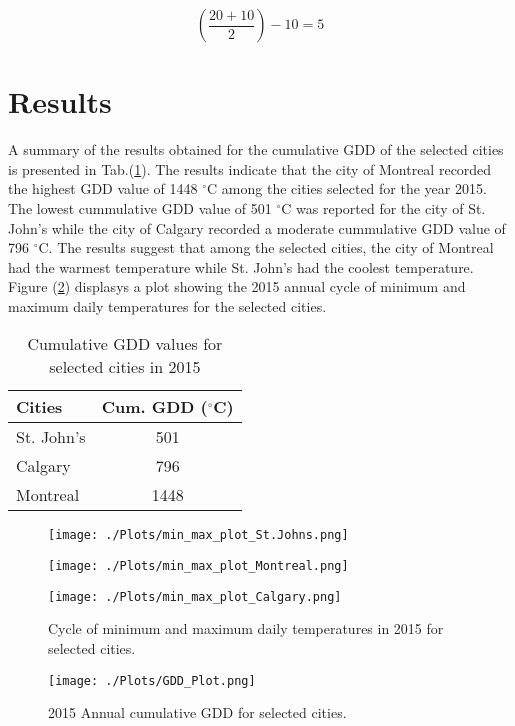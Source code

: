 \documentclass{article}
\begin{document}
\[ \left(\frac {20+10}{2}\right)-10=5 \] \par

\newpage
\section{ \bf Results}
A summary of the results obtained for the cumulative GDD of the selected cities is presented in Tab.(\ref{gdd-results}). The results indicate that the city of Montreal recorded the highest GDD value of 1448 $^{\circ}$C among the cities selected for the year 2015. The lowest cummulative GDD value of 501 $^{\circ}$C was reported for the city of St. John's while the city of Calgary recorded a moderate cummulative GDD value of 796 $^{\circ}$C. The results suggest that among the selected cities, the city of Montreal had the warmest temperature while St. John's had the coolest temperature. Figure (\ref{gdd-cycle}) displasys a plot showing the 2015 annual cycle of minimum and maximum daily temperatures for the selected cities.


\begin{table}[h]
\caption{Cumulative GDD values for selected cities in 2015} 
\label{gdd-results}
\centering
\begin{tabular}{l c}
\hline
\textbf{Cities} & \textbf{Cum. GDD} \textbf($^{\circ}$C) \\
\hline
St. John's & 501 \\
Calgary & 796 \\
Montreal & 1448 \\
\hline
\end{tabular}
\end{table}


\begin{center}
\begin{figure}
\texttt{[image: ./Plots/min\_max\_plot\_St.Johns.png]}

\texttt{[image: ./Plots/min\_max\_plot\_Montreal.png]}

\texttt{[image: ./Plots/min\_max\_plot\_Calgary.png]}

\caption{Cycle of minimum and maximum daily temperatures in 2015 for selected cities.}
\label{gdd-cycle}
\end{figure}
\end{center}


\begin{center}
\begin{figure}
\texttt{[image: ./Plots/GDD\_Plot.png]}
\caption{2015 Annual cumulative GDD for selected cities.}
\label{gdd-cycle}
\end{figure}
\end{center}
\end{document}
